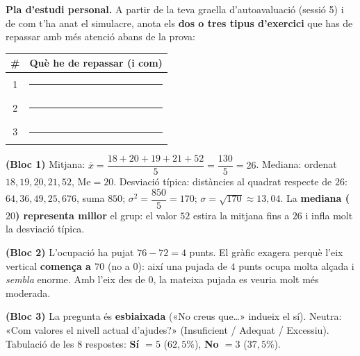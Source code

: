 \noindent\textbf{Pla d'estudi personal.} A partir de la teva graella d'autoavaluació
(sessió 5) i de com t'ha anat el simulacre, anota els \textbf{dos o tres tipus
d'exercici} que has de repassar amb més atenció abans de la prova:
\begin{center}
\renewcommand{\arraystretch}{1.5}
\begin{tabular}{c p{10.5cm}}
\toprule
\textbf{\#} & \textbf{Què he de repassar (i com)} \\
\midrule
1 & \rule{9.8cm}{0.4pt} \\
2 & \rule{9.8cm}{0.4pt} \\
3 & \rule{9.8cm}{0.4pt} \\
\bottomrule
\end{tabular}
\end{center}

\begin{solucions}
\begin{sollist}
  \item \textbf{(Bloc 1)} Mitjana:
        $\overline{x}=\dfrac{18+20+19+21+52}{5}=\dfrac{130}{5}=26$. Mediana: ordenat
        $18,19,\underline{20},21,52$, $\text{Me}=20$. Desviació típica: distàncies al
        quadrat respecte de $26$: $64,36,49,25,676$, suma $850$;
        $\sigma^2=\dfrac{850}{5}=170$; $\sigma=\sqrt{170}\approx 13,04$. La
        \textbf{mediana ($20$) representa millor} el grup: el valor $52$ estira la
        mitjana fins a $26$ i infla molt la desviació típica.
  \item \textbf{(Bloc 2)} L'ocupació ha pujat $76-72=4$ punts. El gràfic exagera perquè
        l'eix vertical \textbf{comença a $70$} (no a $0$): així una pujada de $4$ punts
        ocupa molta alçada i \emph{sembla} enorme. Amb l'eix des de $0$, la mateixa
        pujada es veuria molt més moderada.
  \item \textbf{(Bloc 3)} La pregunta és \textbf{esbiaixada} («No creus que\dots»
        indueix el sí). Neutra: «Com valores el nivell actual d'ajudes?»
        (Insuficient / Adequat / Excessiu). Tabulació de les $8$ respostes:
        \textbf{Sí $=5$} ($62,5\%$), \textbf{No $=3$} ($37,5\%$).
\end{sollist}
\end{solucions}
